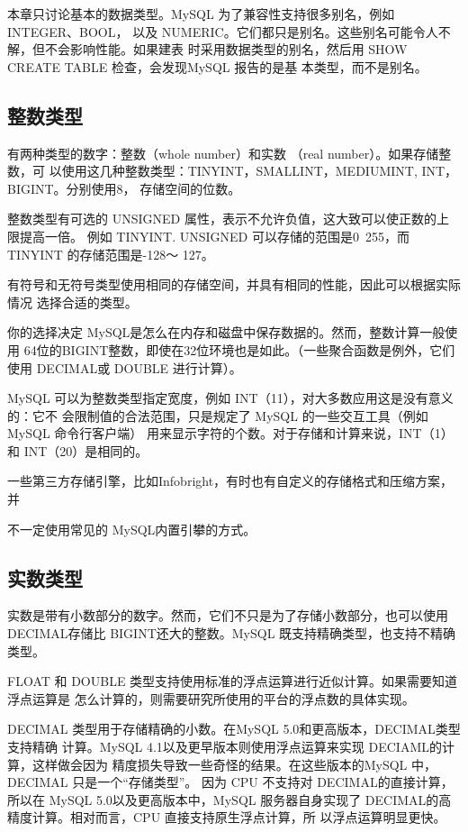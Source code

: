 本章只讨论基本的数据类型。MySQL 为了兼容性支持很多别名，例如 INTEGER、BOOL，
以及 NUMERIC。它们都只是别名。这些别名可能令人不解，但不会影响性能。如果建表
时采用数据类型的别名，然后用 SHOW CREATE TABLE 检查，会发现MySQL 报告的是基
本类型，而不是别名。

\subsection{整数类型}
有两种类型的数字：整数（whole number）和实数 （real number）。如果存储整数，可
以使用这几种整数类型：TINYINT，SMALLINT，MEDIUMINT, INT，BIGINT。分别使用8，
存储空间的位数。

整数类型有可选的 UNSIGNED 属性，表示不允许负值，这大致可以使正数的上限提高一倍。
例如 TINYINT. UNSIGNED 可以存储的范围是0~255，而 TINYINT 的存储范围是-128～
127。

有符号和无符号类型使用相同的存储空间，并具有相同的性能，因此可以根据实际情况
选择合适的类型。

你的选择决定 MySQL是怎么在内存和磁盘中保存数据的。然而，整数计算一般使用
64位的BIGINT整数，即使在32位环境也是如此。（一些聚合函数是例外，它们使用
DECIMAL或 DOUBLE 进行计算）。

MySQL 可以为整数类型指定宽度，例如 INT（11），对大多数应用这是没有意义的：它不
会限制值的合法范围，只是规定了 MySQL 的一些交互工具（例如 MySQL 命令行客户端）
用来显示字符的个数。对于存储和计算来说，INT（1）和 INT（20）是相同的。

一些第三方存储引擎，比如Infobright，有时也有自定义的存储格式和压缩方案，并

不一定使用常见的 MySQL内置引攀的方式。

\subsection{实数类型}
实数是带有小数部分的数字。然而，它们不只是为了存储小数部分，也可以使用
DECIMAL存储比 BIGINT还大的整数。MySQL 既支持精确类型，也支持不精确类型。

FLOAT 和 DOUBLE 类型支持使用标准的浮点运算进行近似计算。如果需要知道浮点运算是
怎么计算的，则需要研究所使用的平台的浮点数的具体实现。

DECIMAL 类型用于存储精确的小数。在MySQL 5.0和更高版本，DECIMAL类型支持精确
计算。MySQL 4.1以及更早版本则使用浮点运算来实现 DECIAML的计算，这样做会因为
精度损失导致一些奇怪的结果。在这些版本的MySQL 中，DECIMAL 只是一个“存储类型”。
因为 CPU 不支持对 DECIMAL的直接计算，所以在 MySQL 5.0以及更高版本中，MySQL
服务器自身实现了 DECIMAL的高精度计算。相对而言，CPU 直接支持原生浮点计算，所
以浮点运算明显更快。

